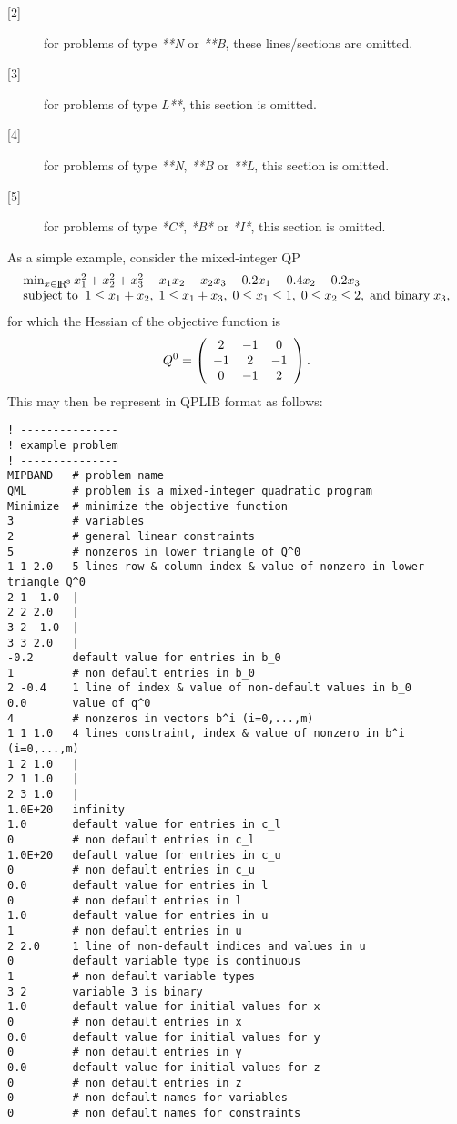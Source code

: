 \begin{description}
\item [{[2]}]
for problems of type \textit{**N} or \textit{**B}, these lines/sections
are omitted.
\item [{[3]}]
for problems of type \textit{L**}, this section is omitted.
\item [{[4]}]
for problems of type \textit{**N}, \textit{**B} or \textit{**L},
this section is omitted.
\item [{[5]}]
for problems of type \textit{*C*}, \textit{*B*} or \textit{*I*},
this section is omitted.
\end{description}

As a simple example, consider the mixed-integer QP
\[\arr{l}{\min_{x \in \smallRe^3} x_1^2 + x_2^2 + x_3^2 - x_1 x_2 - x_2 x_3
  - 0.2 x_1  -0.4 x_2 - 0.2 x_3 \\
\st 1 \leq x_1 + x_2, \; 1 \leq x_1 + x_3, \; 0 \leq x_1 \leq 1,
\; 0 \leq x_2 \leq 2, \; \mbox{and binary} \; x_3,}
\]
for which the Hessian of the objective function is
\[Q^0 = \mat{ccc}{2 & -1 & 0 \\ -1 & 2 & -1 \\ 0 & -1 & 2}.\]
This may then be represent in QPLIB format as follows:

{\small
\begin{verbatim}
! ---------------
! example problem
! ---------------
MIPBAND   # problem name
QML       # problem is a mixed-integer quadratic program
Minimize  # minimize the objective function
3         # variables
2         # general linear constraints
5         # nonzeros in lower triangle of Q^0
1 1 2.0   5 lines row & column index & value of nonzero in lower triangle Q^0
2 1 -1.0  |
2 2 2.0   |
3 2 -1.0  |
3 3 2.0   |
-0.2      default value for entries in b_0
1         # non default entries in b_0
2 -0.4    1 line of index & value of non-default values in b_0
0.0       value of q^0
4         # nonzeros in vectors b^i (i=0,...,m)
1 1 1.0   4 lines constraint, index & value of nonzero in b^i (i=0,...,m)
1 2 1.0   |
2 1 1.0   |
2 3 1.0   |
1.0E+20   infinity
1.0       default value for entries in c_l
0         # non default entries in c_l
1.0E+20   default value for entries in c_u
0         # non default entries in c_u
0.0       default value for entries in l
0         # non default entries in l
1.0       default value for entries in u
1         # non default entries in u
2 2.0     1 line of non-default indices and values in u
0         default variable type is continuous
1         # non default variable types
3 2       variable 3 is binary
1.0       default value for initial values for x
0         # non default entries in x
0.0       default value for initial values for y
0         # non default entries in y
0.0       default value for initial values for z
0         # non default entries in z
0         # non default names for variables
0         # non default names for constraints
\end{verbatim}
}

